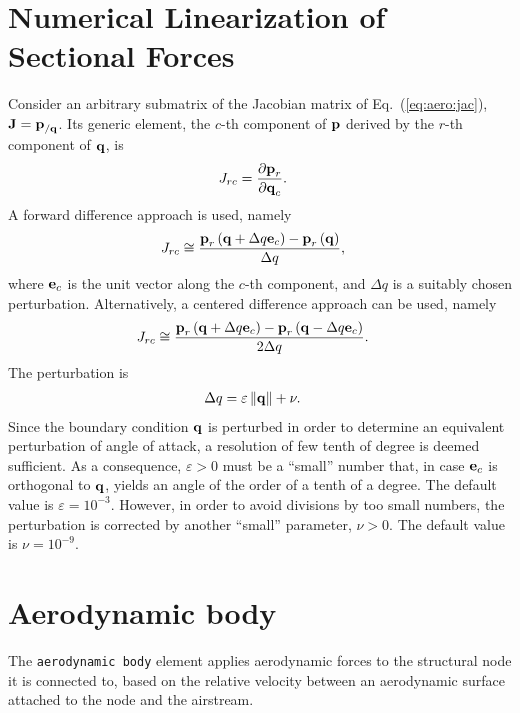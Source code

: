 \section{Numerical Linearization of Sectional Forces}
Consider an arbitrary submatrix of the Jacobian matrix
of Eq.~(\ref{eq:aero:jac}), $\bm{\mathbf{J}}=\bm{\mathbf{p}}_{/\bm{\mathbf{q}}}$.
Its generic element, the $c$-th component of $\bm{\mathbf{p}}$
derived by the $r$-th component of $\bm{\mathbf{q}}$, is
\begin{align}
	J_{rc} &= \frac{\partial\bm{\mathbf{p}}_r}{\partial\bm{\mathbf{q}}_c}
	.
\end{align}
A forward difference approach is used, namely
\begin{align}
	J_{rc} &\cong \frac{
		\bm{\mathbf{p}}_r\left( \bm{\mathbf{q}} + \Delta q \bm{\mathbf{e}}_c \right)
		- \bm{\mathbf{p}}_r\left( \bm{\mathbf{q}} \right)
	}{
		\Delta q
	}
	,
\end{align}
where $\bm{\mathbf{e}}_c$ is the unit vector along the $c$-th component,
and $\Delta q$ is a suitably chosen perturbation.
Alternatively, a centered difference approach can be used, namely
\begin{align}
	J_{rc} &\cong \frac{
		\bm{\mathbf{p}}_r\left( \bm{\mathbf{q}} + \Delta q \bm{\mathbf{e}}_c \right)
		- \bm{\mathbf{p}}_r\left( \bm{\mathbf{q}} - \Delta q \bm{\mathbf{e}}_c \right)
	}{
		2 \Delta q
	}
	.
\end{align}
The perturbation is
\begin{align}
	\Delta q &= \varepsilon \left\| \bm{\mathbf{q}} \right\| + \nu
	.
\end{align}
Since the boundary condition $\bm{\mathbf{q}}$ is perturbed in order to determine
an equivalent perturbation of angle of attack, a resolution of few tenth
of degree is deemed sufficient.
As a consequence, $\varepsilon>0$ must be a ``small'' number
that, in case $\bm{\mathbf{e}}_c$ is orthogonal to $\bm{\mathbf{q}}$,
yields an angle of the order of a tenth of a degree.
The default value is $\varepsilon=10^{-3}$.
However, in order to avoid divisions by too small numbers,
the perturbation is corrected by another ``small'' parameter,
$\nu>0$.
The default value is $\nu=10^{-9}$.



\section{Aerodynamic body}
The \texttt{aerodynamic body} element applies aerodynamic forces
to the structural node it is connected to,
based on the relative velocity between an aerodynamic surface attached 
to the node and the airstream.

